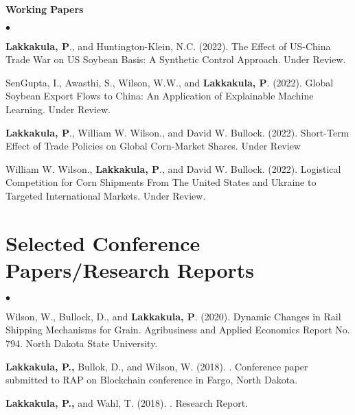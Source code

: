 \documentclass[margin,line]{res}
\newenvironment{list2}{
  \begin{list}{$\bullet$}{%
    \setlength{\itemsep}{0in}
    \setlength{\parsep}{0in} \setlength{\parskip}{0in}
    \setlength{\topsep}{0in} \setlength{\partopsep}{0in}
    \setlength{\leftmargin}{0.2in}}}{\end{list}}
\begin{document}
\begin{resume}
{\bf Working Papers}
\\
\begin{list2}
\item {\bf Lakkakula, P}., and Huntington-Klein, N.C. (2022). The Effect of US-China Trade War on US Soybean Basis: A Synthetic Control Approach. Under Review.
\item SenGupta, I., Awasthi, S., Wilson, W.W., and {\bf Lakkakula, P}. (2022). Global Soybean Export Flows to China: An Application of Explainable Machine Learning. Under Review.
\item {\bf Lakkakula, P}., William W. Wilson., and David W. Bullock. (2022). Short-Term Effect of Trade Policies on Global Corn-Market Shares. Under Review
\item William W. Wilson., {\bf Lakkakula, P}., and David W. Bullock. (2022). Logistical Competition for Corn Shipments From The United States and Ukraine to Targeted International Markets. Under Review.

\end{list2}

\section{\sc Selected Conference Papers/Research Reports}
\begin{list2}
\item Wilson, W., Bullock, D., and {\bf Lakkakula, P}. (2020). Dynamic Changes in Rail Shipping Mechanisms for Grain. Agribusiness and Applied Economics Report No. 794. North Dakota State University.
\item {\bf Lakkakula, P.,} Bullok, D., and Wilson, W. (2018). . Conference paper submitted to RAP on Blockchain conference in Fargo, North Dakota. 
\item {\bf Lakkakula, P.,} and Wahl, T. 
(2018). . Research Report. 


\end{list2}
\end{resume}
\end{document}
